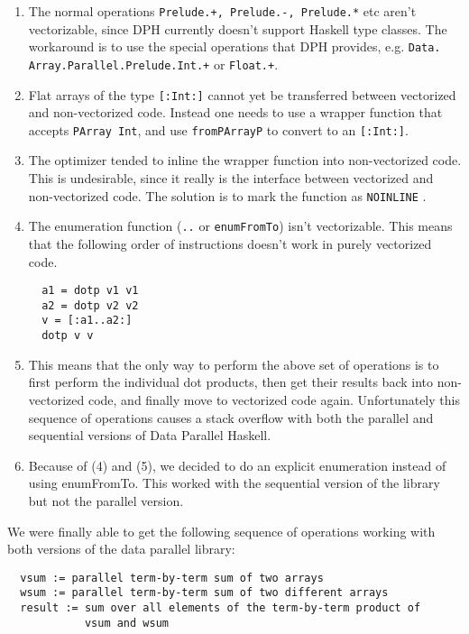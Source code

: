 \documentclass[a4paper]{acmtrans2m}
\begin{document}
\begin{enumerate}
\item The normal operations \texttt{Prelude.+, Prelude.-, Prelude.*} etc aren't vectorizable, since DPH currently doesn't support Haskell type classes. The workaround
is to use the special operations that DPH provides, e.g. \texttt{Data. Array.Parallel.Prelude.Int.+} or \texttt{Float.+}.

\item Flat arrays of the type \texttt{[:Int:]} cannot yet be transferred between
vectorized and non-vectorized code. Instead one needs to use a wrapper function
that accepts \texttt{PArray Int}, and use \texttt{fromPArrayP} to
convert to an \texttt{[:Int:]}.

\item The optimizer tended to inline the wrapper function into non-vectorized
code. This is undesirable, since it really is the interface between vectorized and
non-vectorized code. The solution is to mark the function as \texttt{NOINLINE} 
.

\item The enumeration function (\texttt{..} or \texttt{enumFromTo}) isn't
vectorizable. This means that the following order of instructions doesn't work in
purely vectorized code.

\begin{verbatim}
  a1 = dotp v1 v1
  a2 = dotp v2 v2
  v = [:a1..a2:]
  dotp v v
\end{verbatim}

\item This means that the only way to perform the above set of operations is to
first perform the individual dot products, then get their results back into
non-vectorized code, and finally move to vectorized code again. Unfortunately
this sequence of operations causes a stack overflow with both the parallel and
sequential versions of Data Parallel Haskell.

\item Because of (4) and (5), we decided to do an explicit enumeration instead 
of using enumFromTo. This worked with the sequential version of the library but not
the parallel version.
\end{enumerate}

We were finally able to get the following sequence of operations working with both
versions of the data parallel library:

\begin{verbatim}
  vsum := parallel term-by-term sum of two arrays
  wsum := parallel term-by-term sum of two different arrays
  result := sum over all elements of the term-by-term product of
            vsum and wsum
\end{verbatim}
\end{document}
